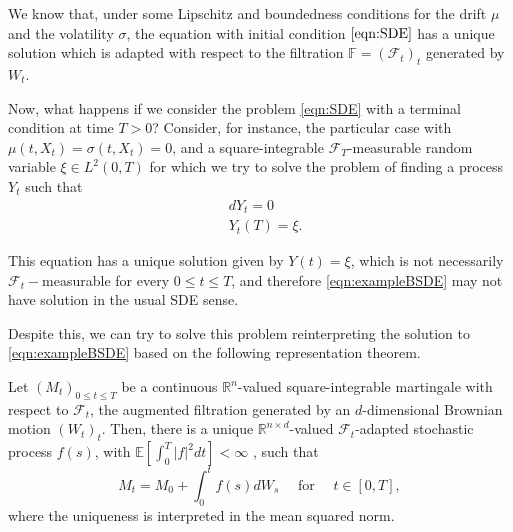 We know that, under some Lipschitz and boundedness conditions for the drift $\mu$ and the volatility $\sigma$, the equation with initial condition $\eqref{eqn:SDE}$ has a unique solution which is adapted with respect to the filtration $\mathbb{F}=(\mathcal{F}_t)_t$ generated by $W_t$.

Now, what happens if we consider the problem \eqref{eqn:SDE} with a terminal condition at time $T>0$? Consider, for instance, the particular case with $\mu(t,X_t)=\sigma(t,X_t)=0$, and a square-integrable $\mathcal{F}_T$-measurable random variable $\xi\in L^2(0,T)$ for which we try to solve the problem of finding a process $Y_t$ such that
\begin{equation}
	\label{eqn:exampleBSDE}
	\begin{split}
		&dY_t=0\\
		&Y_t(T)=\xi.
	\end{split}
\end{equation}

This equation has a unique solution given by $Y(t)=\xi$, which is not necessarily $\mathcal{F}_t-$measurable for every $0\leq t \leq T$, and therefore \eqref{eqn:exampleBSDE} may not have solution in the usual SDE sense. 

Despite this, we can try to solve this problem reinterpreting the solution to \eqref{eqn:exampleBSDE} based on the following representation theorem.
\begin{theorem}
	\label{thm:MRT} Let $(M_t)_{0\leq t \leq T}$ be a continuous $\mathbb{R}^n$-valued square-integrable martingale with respect to $\mathcal{F}_t$, the augmented filtration generated by an $d$-dimensional Brownian motion $(W_t)_t$. Then, there is a unique $\mathbb{R}^{n\times d}$-valued $\mathcal{F}_t$-adapted stochastic process $f(s)$, with $\mathbb{E}[\int_{0}^{T}|f|^2dt]<\infty$ , such that 
	\begin{equation}
		M_t=M_0+\int_{0}^{t}f(s)dW_s \quad \text{ for } \quad t\in [0,T],
	\end{equation}
	where the uniqueness is interpreted in the mean squared norm.
\end{theorem}

